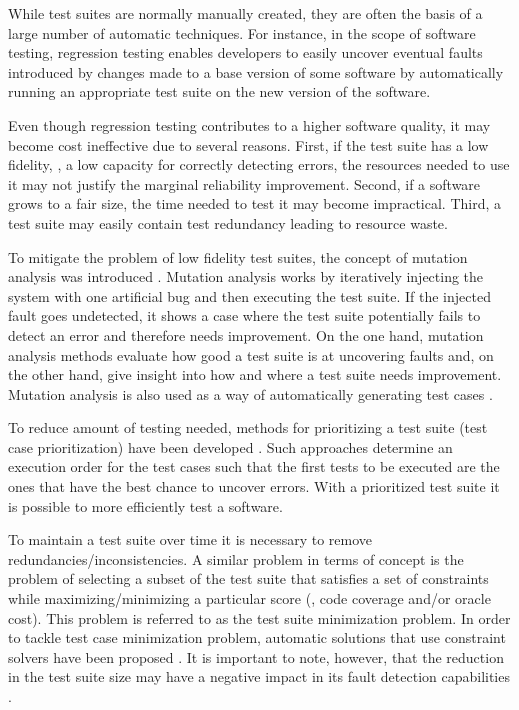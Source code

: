 While test suites are normally manually created, they are often the
basis of a large number of automatic techniques.
%
For instance, in the scope of software testing, regression testing
\citep{Vokolos98} enables developers to easily uncover eventual faults
introduced by changes made to a base version of some software by
automatically running an appropriate test suite on the new version of
the software.

Even though regression testing contributes to a higher software
quality, it may become cost ineffective due to several reasons.
%
First, if the test suite has a low fidelity, \ie, a low capacity for
correctly detecting errors, the resources needed to use it may not
justify the marginal reliability improvement.
%
Second, if a software grows to a fair size, the time needed to test it
may become impractical.
%
Third, a test suite may easily contain test redundancy leading to
resource waste.

To mitigate the problem of low fidelity test suites, the concept of
mutation analysis was introduced \citep{DeMillo78}.
%
Mutation analysis works by iteratively injecting the system with one
artificial bug and then executing the test suite.
%
If the injected fault goes undetected, it shows a case where the test
suite potentially fails to detect an error and therefore needs
improvement.
%
On the one hand, mutation analysis methods evaluate how good a test
suite is at uncovering faults and, on the other hand, give insight
into how and where a test suite needs improvement.
%
Mutation analysis is also used as a way of automatically generating
test cases \citep{Fraser11,Fraser12,Fraser13,Campos13b}.
%

To reduce amount of testing needed, methods for prioritizing a test
suite (test case prioritization) have been developed
\citep{Rothermel99,
  Rothermel01,Bryce07,Sanchez11,Elbaum02,Sun13,Huang10}.
%
Such approaches determine an execution order for the test cases such
that the first tests to be executed are the ones that have the best
chance to uncover errors.
%
With a prioritized test suite it is possible to more efficiently test
a software.

To maintain a test suite over time it is necessary to remove
redundancies/inconsistencies.
%
A similar problem in terms of concept is the problem of selecting a
subset of the test suite that satisfies a set of constraints while
maximizing/minimizing a particular score (\eg, code coverage and/or
oracle cost).
%
This problem is referred to as the test suite minimization problem.
%
In order to tackle test case minimization problem, automatic solutions
that use constraint solvers have been proposed
\citep{Arito12,Campos13a,Mondal15}.
%
It is important to note, however, that the reduction in the test suite
size may have a negative impact in its fault detection capabilities
\citep{Rothermel98}.



